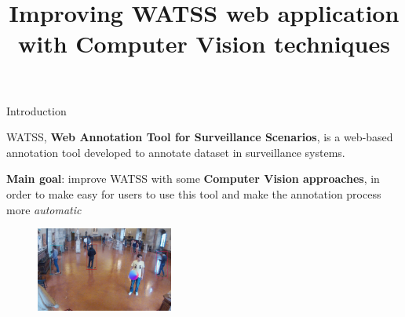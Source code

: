 \documentclass{beamer}
\author{}
\title{\huge Improving WATSS web application with Computer Vision techniques}
\date{}
\begin{document}
\titlepageframe

\begin{tframe}{Introduction}

WATSS, \textbf{Web Annotation Tool for Surveillance Scenarios}, is a web-based annotation tool developed to annotate dataset in surveillance systems.

\vspace{0.3cm}

\textbf{Main goal}: improve WATSS with some \textbf{Computer Vision approaches}, in order to make easy for users to use this tool and make the annotation process more \emph{automatic}

\begin{figure}[h]
\begin{center}
\includegraphics[width=0.4\textwidth]{images/frame.jpg}
\end{center}
\label{fig:mainframe}
\end{figure}

\end{tframe}
\end{document}
